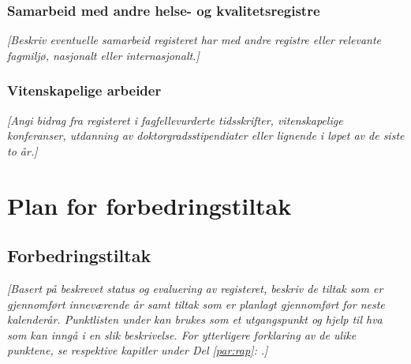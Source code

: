 \documentclass[norsk, a4paper, twocolumn]{report}
\newcommand{\guide}[1] {
	\textit{[\textcolor{guidegray}{#1}]}
	}
\begin{document}
\section{Samarbeid med andre helse- og kvalitetsregistre}\label{sec:samfag}
\guide{Beskriv eventuelle samarbeid registeret har med andre registre eller relevante fagmiljø, nasjonalt eller internasjonalt.}

\section{Vitenskapelige arbeider}\label{sec:vitarb}
\guide{Angi bidrag fra registeret i fagfellevurderte tidsskrifter,
vitenskapelige konferanser, utdanning av doktorgradsstipendiater eller
lignende i løpet av de siste to år.}




\onecolumn


\part{Plan for forbedringstiltak}\label{par:for}


\chapter{Forbedringstiltak}
\guide{Basert på beskrevet status og evaluering av registeret, beskriv de
tiltak som er gjennomført inneværende år samt tiltak som er planlagt gjennomført  for neste kalenderår.
Punktlisten under kan brukes som et utgangspunkt og hjelp til hva som kan
inngå i en slik beskrivelse. For ytterligere forklaring av de ulike punktene,
se respektive kapitler under Del \ref{par:rap}: \nameref{par:rap}.}
\end{document}
